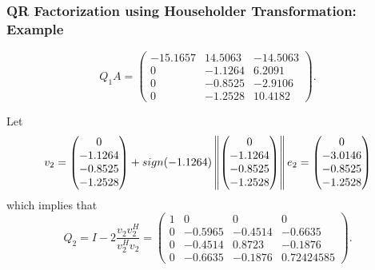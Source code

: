 \documentclass{beamer}
\begin{document}
\begin{frame}\frametitle{QR Factorization using Householder Transformation: Example}
	\[
		Q_1A = 
			\begin{pmatrix}
				-15.1657 & 14.5063 & -14.5063 \\
				0 & -1.1264 & 6.2091\\
				0 & -0.8525 & -2.9106 \\
				0 & -1.2528 & 10.4182			
			\end{pmatrix}.
	\]

	Let 
	\[
		v_2 = 
			\begin{pmatrix} 
				0 \\ -1.1264\\-0.8525\\-1.2528
			\end{pmatrix} 
			+ sign(-1.1264)
				\left\|
					\begin{pmatrix} 
						0 \\-1.1264\\-0.8525\\-1.2528
					\end{pmatrix}
				\right\| e_2 
			= \begin{pmatrix} 
				0 \\-3.0146 \\ -0.8525\\ -1.2528
			  \end{pmatrix}
	\]
	which implies that
	\[
		Q_2 = I - 2\frac{v_2v_2^H}{v_2^Hv_2}
			= \begin{pmatrix}
				1 & 0 & 0 & 0 \\
 				0 & -0.5965 & -0.4514 & -0.6635 \\
				0 & -0.4514 & 0.8723 & -0.1876 \\
 				0 & -0.6635 & -0.1876 & 0.72424585
 			  \end{pmatrix}.
	\]
	\end{frame}
\end{document}
